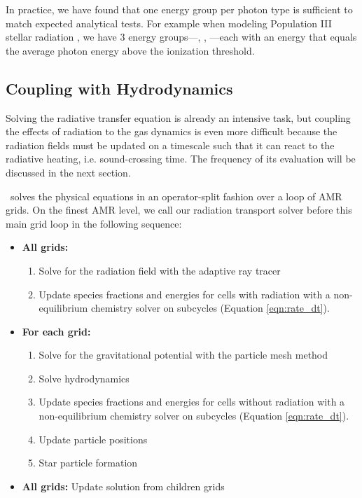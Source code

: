 \documentclass[apj,onecolumn]{emulateapj}
\begin{document}
In practice, we have found that one energy group per photon type is
sufficient to match expected analytical tests.  For example when
modeling Population III stellar radiation \citep[e.g.][for hydrogen
  ionizing radiation only]{Abel07, Wise08_Gal}, we have 3 energy
groups---, , ---each with an energy
that equals the average photon energy above the ionization threshold.

\subsection{Coupling with Hydrodynamics}
\label{sec:coupling}

Solving the radiative transfer equation is already an intensive task,
but coupling the effects of radiation to the gas dynamics is even more
difficult because the radiation fields must be updated on a timescale
such that it can react to the radiative heating, i.e. sound-crossing
time.  The frequency of its evaluation will be discussed in the next
section.

\enzo~solves the physical equations in an operator-split fashion over
a loop of AMR grids.  On the finest AMR level, we call our radiation
transport solver before this main grid loop in the following sequence:
\begin{itemize}
\item \textbf{All grids:}
  \begin{enumerate}
  \item Solve for the radiation field with the adaptive ray tracer
  \item Update species fractions and energies for cells with radiation
    with a non-equilibrium chemistry solver on subcycles (Equation
    \ref{eqn:rate_dt}).
  \end{enumerate}
\item \textbf{For each grid:}
  \begin{enumerate}
  \item Solve for the gravitational potential with the particle mesh
    method
  \item Solve hydrodynamics
  \item Update species fractions and energies for cells without
    radiation with a non-equilibrium chemistry solver on subcycles
    (Equation \ref{eqn:rate_dt}).
  \item Update particle positions
  \item Star particle formation
  \end{enumerate}
\item \textbf{All grids:} Update solution from children grids
\end{itemize}
%
\end{document}
